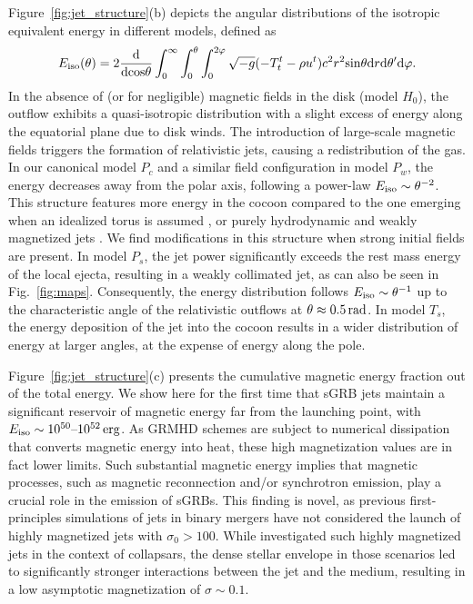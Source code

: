\documentclass[twocolumn,dvipsnames]{aastex62}
\begin{document}
Figure~\ref{fig:jet_structure}(b) depicts the angular distributions of the isotropic equivalent energy in different models, defined as
\begin{equation}
    E_{\rm iso}(\theta) = 2\frac{\mathrm{d}}{\mathrm{d}{\rm cos}\theta}\int_0^\infty\int_0^\theta\int_0^{2\varphi}\sqrt{-g}(-T^t_t - \rho u^t)c^2r^2{\rm sin}\theta\mathrm{d}r\mathrm{d}\theta'\mathrm{d}\varphi.
\end{equation}
In the absence of (or for negligible) magnetic fields in the disk (model $ H_0 $), the outflow exhibits a quasi-isotropic distribution with a slight excess of energy along the equatorial plane due to disk winds. The introduction of large-scale magnetic fields triggers the formation of relativistic jets, causing a redistribution of the gas. In our canonical model $ P_c $ and a similar field configuration in model $ P_w $, the energy decreases away from the polar axis, following a power-law $ E_{\rm iso} \sim \theta^{-2} $. This structure features more energy in the cocoon compared to the one emerging when an idealized torus is assumed \citep[model $ V $ in][]{Gottlieb2022d}, or purely hydrodynamic and weakly magnetized jets \citep{Gottlieb2020b,Gottlieb2021a}. We find modifications in this structure when strong initial fields are present. In model $ P_s $, the jet power significantly exceeds the rest mass energy of the local ejecta, resulting in a weakly collimated jet, as can also be seen in Fig.~\ref{fig:maps}. Consequently, the energy distribution follows $ E_{\rm iso} \sim \theta^{-1} $ up to the characteristic angle of the relativistic outflows at $ \theta \approx 0.5\,{\rm rad} $. In model $ T_s $, the energy deposition of the jet into the cocoon results in a wider distribution of energy at larger angles, at the expense of energy along the pole.

Figure~\ref{fig:jet_structure}(c) presents the cumulative magnetic energy fraction out of the total energy. We show here for the first time that sGRB jets maintain a significant reservoir of magnetic energy far from the launching point, with $ E_{\rm iso} \sim 10^{50} \mbox{--} 10^{52}\,{\rm erg} $. As GRMHD schemes are subject to numerical dissipation that converts magnetic energy into heat, these high magnetization values are in fact lower limits. Such substantial magnetic energy implies that magnetic processes, such as magnetic reconnection and/or synchrotron emission, play a crucial role in the emission of sGRBs. This finding is novel, as previous first-principles simulations of jets in binary mergers have not considered the launch of highly magnetized jets with $ \sigma_0 > 100 $. While \citet{Gottlieb2022b} investigated such highly magnetized jets in the context of collapsars, the dense stellar envelope in those scenarios led to significantly stronger interactions between the jet and the medium, resulting in a low asymptotic magnetization of $ \sigma \sim 0.1 $.
\end{document}

